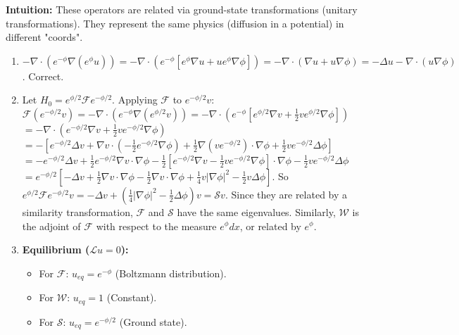 \begin{solution}
\textbf{Intuition:} These operators are related via ground-state transformations (unitary transformations). They represent the same physics (diffusion in a potential) in different "coords".

\begin{enumerate}
    \item[(i)] $-\nabla \cdot (e^{-\phi} \nabla (e^\phi u)) = -\nabla \cdot (e^{-\phi} [e^\phi \nabla u + u e^\phi \nabla \phi]) = -\nabla \cdot (\nabla u + u \nabla \phi) = -\Delta u - \nabla \cdot (u \nabla \phi)$. Correct.
    
    \item[(ii)] Let $H_0 = e^{\phi/2} \mathcal{F} e^{-\phi/2}$.
    Applying $\mathcal{F}$ to $e^{-\phi/2} v$:
    $\mathcal{F}(e^{-\phi/2} v) = -\nabla \cdot (e^{-\phi} \nabla (e^{\phi/2} v)) = -\nabla \cdot (e^{-\phi} [e^{\phi/2} \nabla v + \frac{1}{2} v e^{\phi/2} \nabla \phi])$
    $= -\nabla \cdot (e^{-\phi/2} \nabla v + \frac{1}{2} v e^{-\phi/2} \nabla \phi)$
    $= -[e^{-\phi/2} \Delta v + \nabla v \cdot (-\frac{1}{2} e^{-\phi/2} \nabla \phi) + \frac{1}{2} \nabla (v e^{-\phi/2}) \cdot \nabla \phi + \frac{1}{2} v e^{-\phi/2} \Delta \phi]$
    $= - e^{-\phi/2} \Delta v + \frac{1}{2} e^{-\phi/2} \nabla v \cdot \nabla \phi - \frac{1}{2} [e^{-\phi/2} \nabla v - \frac{1}{2} v e^{-\phi/2} \nabla \phi] \cdot \nabla \phi - \frac{1}{2} v e^{-\phi/2} \Delta \phi$
    $= e^{-\phi/2} [-\Delta v + \frac{1}{2} \nabla v \cdot \nabla \phi - \frac{1}{2} \nabla v \cdot \nabla \phi + \frac{1}{4} v |\nabla \phi|^2 - \frac{1}{2} v \Delta \phi]$.
    So $e^{\phi/2} \mathcal{F} e^{-\phi/2} v = -\Delta v + (\frac{1}{4} |\nabla \phi|^2 - \frac{1}{2} \Delta \phi) v = \mathcal{S} v$.
    Since they are related by a similarity transformation, $\mathcal{F}$ and $\mathcal{S}$ have the same eigenvalues.
    Similarly, $\mathcal{W}$ is the adjoint of $\mathcal{F}$ with respect to the measure $e^\phi dx$, or related by $e^\phi$.
    
    \item[(iii)] \textbf{Equilibrium ($\mathcal{L}u = 0$):}
    \begin{itemize}
        \item For $\mathcal{F}$: $u_{eq} = e^{-\phi}$ (Boltzmann distribution).
        \item For $\mathcal{W}$: $u_{eq} = 1$ (Constant).
        \item For $\mathcal{S}$: $u_{eq} = e^{-\phi/2}$ (Ground state).
    \end{itemize}
\end{enumerate}
\end{solution}

